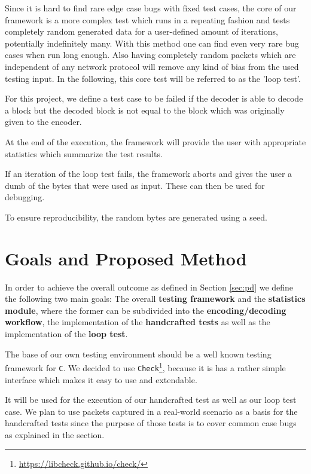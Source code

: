 \documentclass[a4paper,english,10pt]{tumarticle}
\begin{document}
Since it is hard to find rare edge case bugs with fixed test cases, the core of our framework is a more complex test which runs in a repeating fashion and tests completely random generated data for a user-defined amount of iterations, potentially indefinitely many. With this method one can find even very rare bug cases when run long enough. Also having completely random packets which are independent of any network protocol will remove any kind of bias from the used testing input.
In the following, this core test will be referred to as the 'loop test'.

For this project, we define a test case to be failed if the decoder is able to decode a block but the decoded block is not equal to the block which was originally given to the encoder.

At the end of the execution, the framework will provide the user with appropriate statistics which summarize the test results. 

If an iteration of the loop test fails, the framework aborts and gives the user a dumb of the bytes that were used as input. These can then be used for debugging.

To ensure reproducibility, the random bytes are generated using a seed. 

\section{Goals and Proposed Method}\label{sec:milestones}


In order to achieve the overall outcome as defined in Section \ref{sec:pd} we define the following two main goals: The overall \textbf{testing framework} and the \textbf{statistics module}, where the former can be subdivided into the \textbf{encoding/decoding workflow}, the implementation of the \textbf{handcrafted tests} as well as the implementation of the \textbf{loop test}.

The base of our own testing environment should be a well known testing framework for \texttt{C}. 
We decided to use \texttt{Check}\footnote{\url{https://libcheck.github.io/check/}}, because it is has a rather simple interface which makes it easy to use and extendable.

It will be used for the execution of our handcrafted test as well as our loop test case.
We plan to use packets captured in a real-world scenario as a basis for the handcrafted tests since the purpose of those tests is to cover common case bugs as explained in the section.
\end{document}
